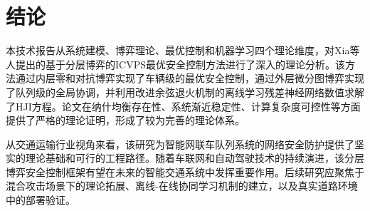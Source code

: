 \documentclass[10.5pt,a4paper,twoside,twocolumn]{ctexart}
\begin{document}
\section{\heiti{} 结论}

本技术报告从系统建模、博弈理论、最优控制和机器学习四个理论维度，对Xia等人提出的基于分层博弈的ICVPS最优安全控制方法进行了深入的理论分析。该方法通过内层零和对抗博弈实现了车辆级的最优安全控制，通过外层微分图博弈实现了队列级的全局协调，并利用改进余弦退火机制的离线学习残差神经网络数值求解了HJI方程。论文在纳什均衡存在性、系统渐近稳定性、计算复杂度可控性等方面提供了严格的理论证明，形成了较为完善的理论体系。

从交通运输行业视角来看，该研究为智能网联车队列系统的网络安全防护提供了坚实的理论基础和可行的工程路径。随着车联网和自动驾驶技术的持续演进，该分层博弈安全控制框架有望在未来的智能交通系统中发挥重要作用。后续研究应聚焦于混合攻击场景下的理论拓展、离线-在线协同学习机制的建立，以及真实道路环境中的部署验证。

\vspace{5mm}




\end{document}
